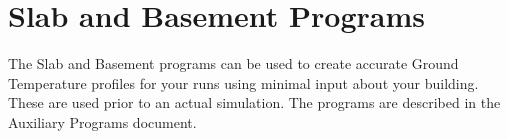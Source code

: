 \section{Slab and Basement Programs}\label{slab-and-basement-programs}

The Slab and Basement programs can be used to create accurate Ground Temperature profiles for your runs using minimal input about your building. These are used prior to an actual simulation. The programs are described in the Auxiliary Programs document.
